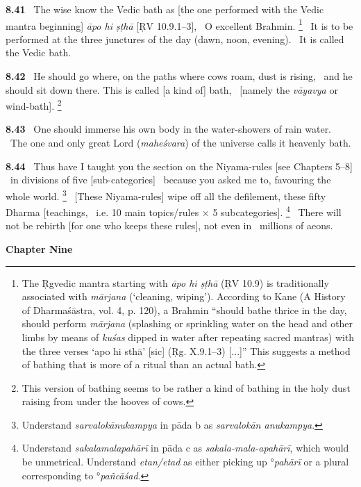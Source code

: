 \documentclass{article}
\newcommand{\skt}[1]{\textit{#1}}
\begin{document}
\textbf{8.41}%
\ The wise know the Vedic bath as [the one performed with the Vedic mantra beginning] \skt{āpo hi ṣṭhā} [ṚV 10.9.1--3],%
\                         O excellent Brahmin.%
\footnote{The Ṛgvedic mantra starting with \skt{āpo hi ṣṭhā} (ṚV 10.9) is traditionally associated with                 \skt{mārjana} (`cleaning, wiping'). According to Kane (A History of Dharmaśāstra, vol. 4, p. 120),                a Brahmin ``should bathe thrice in the day, should perform \skt{mārjana} (splashing                or sprinkling water on the head and other limbs by means of \skt{kuśas}                 dipped in water after repeating sacred mantras) with the three verses `apo hi sthā' [sic] (Ṛg. X.9.1--3) [...]''                This suggests a method of bathing that is more of a ritual than an actual bath. }%
\ It is to be performed at the three junctures of the day (dawn, noon, evening).%
\                 It is called the Vedic bath.%


\textbf{8.42}%
\ He should go where, on the paths where cows roam, dust is rising,%
\ and he should sit down there. This is called [a kind of] bath,%
\                        [namely the \skt{vāyavya} or wind-bath].%
\footnote{This version of bathing seems to be rather a kind of bathing                 in the holy dust raising from under the hooves of cows. }%


\textbf{8.43}%
\ One should immerse his own body in the water-showers of rain water.%
\ The one and only great Lord (\skt{maheśvara}) of the universe calls it heavenly bath.%


\textbf{8.44}%
\ Thus have I taught you the section on the Niyama-rules [see Chapters 5--8]%
\                         in divisions of five [sub-categories]%
\ because you asked me to, favouring the whole world.%
\footnote{Understand \skt{sarvalokānukampya} in pāda b as \skt{sarvalokān anukampya}. }%
\ [These Niyama-rules] wipe off all the defilement, these fifty Dharma [teachings,%
\                         i.e. 10 main topics/rules × 5 subcategories].%
\footnote{Understand \skt{sakalamalapahārī} in pāda c as \skt{sakala-mala-apahārī}, which would be unmetrical.                       Understand \skt{etan/etad} as either picking up °\skt{pahārī} or                        a plural corresponding to °\skt{pañcāśad}. }%
\ There will not be rebirth [for one who keeps these rules], not even in%
\                                millions of aeons.%
\vfill\pagebreak\begin{center}{\large\textbf{ Chapter Nine
}}\end{center}
\end{document}
